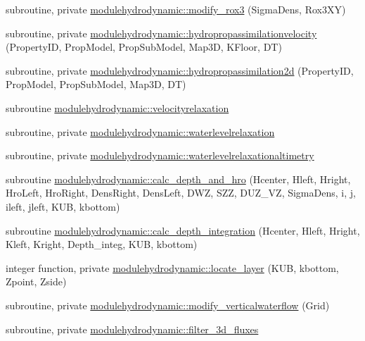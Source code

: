\begin{DoxyCompactItemize}
\item 
subroutine, private \mbox{\hyperlink{namespacemodulehydrodynamic_a9f3d6185fb652a067c6f42b46723a9cc}{modulehydrodynamic\+::modify\+\_\+rox3}} (Sigma\+Dens, Rox3\+XY)
\item 
subroutine, private \mbox{\hyperlink{namespacemodulehydrodynamic_a1979e519c233cd0af0ad00eab566a414}{modulehydrodynamic\+::hydropropassimilationvelocity}} (Property\+ID, Prop\+Model, Prop\+Sub\+Model, Map3D, K\+Floor, DT)
\item 
subroutine, private \mbox{\hyperlink{namespacemodulehydrodynamic_a310b0813e62bd6d4cb63d9e4acbf299d}{modulehydrodynamic\+::hydropropassimilation2d}} (Property\+ID, Prop\+Model, Prop\+Sub\+Model, Map3D, DT)
\item 
subroutine \mbox{\hyperlink{namespacemodulehydrodynamic_a3011a9be54d29dbb8d387a2253b36ab3}{modulehydrodynamic\+::velocityrelaxation}}
\item 
subroutine, private \mbox{\hyperlink{namespacemodulehydrodynamic_af6e5fcf3d54f676a11ab22c650353cef}{modulehydrodynamic\+::waterlevelrelaxation}}
\item 
subroutine, private \mbox{\hyperlink{namespacemodulehydrodynamic_aaf7d95cf12308ea359a620a3f357b5c5}{modulehydrodynamic\+::waterlevelrelaxationaltimetry}}
\item 
subroutine \mbox{\hyperlink{namespacemodulehydrodynamic_a3795523d3d6ec72b6a33735c32624ff2}{modulehydrodynamic\+::calc\+\_\+depth\+\_\+and\+\_\+hro}} (Hcenter, Hleft, Hright, Hro\+Left, Hro\+Right, Dens\+Right, Dens\+Left, D\+WZ, S\+ZZ, D\+U\+Z\+\_\+\+VZ, Sigma\+Dens, i, j, ileft, jleft, K\+UB, kbottom)
\item 
subroutine \mbox{\hyperlink{namespacemodulehydrodynamic_a6026ae01a3e1aa6a649387589a05431c}{modulehydrodynamic\+::calc\+\_\+depth\+\_\+integration}} (Hcenter, Hleft, Hright, Kleft, Kright, Depth\+\_\+integ, K\+UB, kbottom)
\item 
integer function, private \mbox{\hyperlink{namespacemodulehydrodynamic_a24a4da561094133e0ef8f2a5d350d8ac}{modulehydrodynamic\+::locate\+\_\+layer}} (K\+UB, kbottom, Zpoint, Zside)
\item 
subroutine, private \mbox{\hyperlink{namespacemodulehydrodynamic_a46041cae58ee2c4998a230bec6a29842}{modulehydrodynamic\+::modify\+\_\+verticalwaterflow}} (Grid)
\item 
subroutine, private \mbox{\hyperlink{namespacemodulehydrodynamic_a9de56e052f0a5f85cbbcbac9a2f0f95a}{modulehydrodynamic\+::filter\+\_\+3d\+\_\+fluxes}}
\item 

\end{DoxyCompactItemize}

